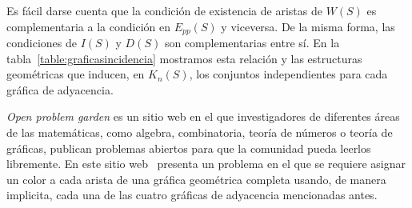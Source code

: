Es fácil darse cuenta que la condición de existencia de aristas de $W(S)$ es
complementaria a la condición en $E_{pp}(S)$ y viceversa. De la misma
forma, las condiciones de $I(S)$ y $D(S)$ son complementarias entre sí. En la tabla~\ref{table:graficasincidencia}
mostramos esta relación y las estructuras geométricas
que inducen, en $K_n(S)$, los conjuntos independientes para cada gráfica de adyacencia.

\emph{Open problem garden} es un sitio web en el que investigadores de
diferentes áreas de las matemáticas, como algebra, combinatoria, teoría de
números o teoría de gráficas, publican problemas abiertos para que la comunidad
pueda leerlos libremente. En este sitio web~\cite{OpenGarden2009} presenta un
problema en el que se requiere asignar un color a cada arista de una gráfica
geométrica completa usando, de manera implicita, cada una de las cuatro
gráficas de adyacencia mencionadas antes.

